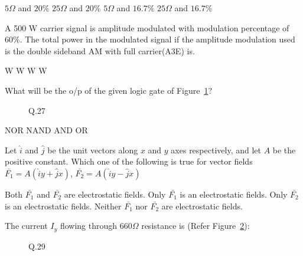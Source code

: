 \documentclass[a4, 12pt, addpoints]{exam}
\begin{document}
\begin{questions}
\begin{oneparchoices}
\choice $5 \Omega$ and $20 \%$ 
\choice $25 \Omega$ and $20 \%$
\choice $5 \Omega$ and $ 16.7 \%$
\choice $25 \Omega$ and $16.7 \%$
\end{oneparchoices} 
\question A 500 W carrier signal is amplitude modulated with modulation percentage of 60\%.  The total power in the modulated signal if the amplitude modulation used is  the double sideband AM with full carrier(A3E) is. \\[0.3cm]
 \begin{oneparchoices}
 W
 W
 W
 W
\end{oneparchoices} 
\question What will be the o/p of the given logic gate of Figure~\ref{lg}?
\begin{figure}[H]
\centering
{}
\caption{Q.27}
\label{lg}
\end{figure}
\begin{oneparchoices}
\choice NOR
\choice NAND
\choice AND
\choice OR
\end{oneparchoices} 
\question Let $\hat{i}$ and $\hat{j}$ be the unit vectors along $x$ and $y$ axes respectively, and let $A$ be the positive constant. Which one of the following is true for vector fields $ \bar{F_1} = A ( \hat{i} y + \hat{j} x ) $, $ \bar{F_2} = A ( \hat{i} y - \hat{j} x ) $  \\[0.3cm]
\begin{oneparchoices}
\choice Both $\bar{F_1}$ and $\bar{F_2}$ are electrostatic fields.
\choice Only $\bar{F_1}$ is an electrostatic fields.
\choice Only $\bar{F_2}$ is an electrostatic fields.
\choice Neither $\bar{F_1}$ nor $\bar{F_2}$ are electrostatic fields.
\end{oneparchoices} 
\question The current $I_y$ flowing through $660 \Omega$ resistance  is (Refer Figure~\ref{fig:1}):
\begin{figure}[H]
\centering
{}
\caption{Q.29}
\label{fig:1}
\end{figure}


\end{questions}
\end{document}
